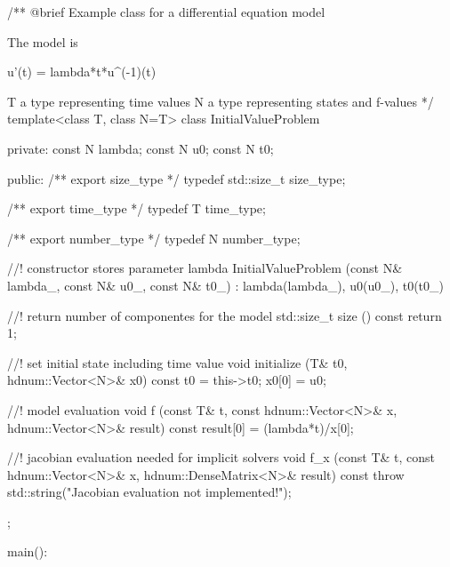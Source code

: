 \documentclass[10pt,oneside,a4paper]{scrartcl}
\begin{document}
    \begin{cppcode}
/** @brief Example class for a differential equation model

    The model is

    u'(t) = lambda*t*u^(-1)(t)

    \tparam T a type representing time values
    \tparam N a type representing states and f-values
*/
template<class T, class N=T>
class InitialValueProblem {
private:
  const N lambda;
  const N u0;
  const N t0;

public:
  /** \brief export size_type */
  typedef std::size_t size_type;

  /** \brief export time_type */
  typedef T time_type;

  /** \brief export number_type */
  typedef N number_type;

  //! constructor stores parameter lambda
  InitialValueProblem (const N& lambda_, const N& u0_, const N& t0_)
    : lambda(lambda_), u0(u0_), t0(t0_)
  {}

  //! return number of componentes for the model
  std::size_t size () const
  {
    return 1;
  }

  //! set initial state including time value
  void initialize (T& t0, hdnum::Vector<N>& x0) const
  {
    t0 = this->t0;
    x0[0] = u0;
  }

  //! model evaluation
  void f (const T& t, const hdnum::Vector<N>& x, hdnum::Vector<N>& result) const
  {
    result[0] = (lambda*t)/x[0];
  }

  //! jacobian evaluation needed for implicit solvers
  void f_x (const T& t, const hdnum::Vector<N>& x, hdnum::DenseMatrix<N>& result) const
  {
    throw std::string("Jacobian evaluation not implemented!");
  }
};    
    \end{cppcode}
        
    main():
    
\end{document}
